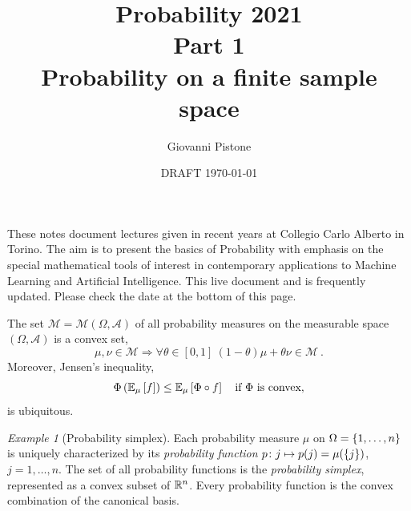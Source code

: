 \documentclass[12pt,a4paper]{amsart}
\title{Probability 2021 \\ Part 1 \\
Probability on a finite sample space}
\author[G. Pistone]{Giovanni Pistone}
\date{DRAFT \today}
\theoremstyle{plain}%
\theoremstyle{definition}
\theoremstyle{remark}
\newtheorem{example}{Example}
\begin{document}
\maketitle

\begin{abstract}

\end{abstract}
These notes document lectures given in recent years at Collegio Carlo Alberto in Torino. The aim is to present the basics of Probability with emphasis on the special mathematical tools of interest in contemporary applications to Machine Learning and Artificial Intelligence. This live document and is frequently updated. Please check the date at the bottom of this page.

\tableofcontents

The set $\mathcal M=\mathcal M(\Omega,\mathcal A)$ of all probability measures on the measurable space $(\Omega,\mathcal A)$ is a convex set,
\begin{equation*}
    \mu,\nu \in \mathcal M \Rightarrow \forall \theta \in [0,1] \ (1-\theta) \mu + \theta \nu  \in \mathcal M \ .
\end{equation*}
Moreover, Jensen's inequality, 
\begin{equation*}
  \Phi\left(\operatorname{\mathbb E}_{\mu}\left[f\right]\right) \leq \operatorname{\mathbb E}_{\mu}\left[\Phi \circ f\right] \quad \text{if $\Phi$ is convex},  
\end{equation*}
is ubiquitous.

\begin{example}[Probability simplex] Each probability measure $\mu$ on
  $\Omega = \left\{1,\dots,n\right\}$ is uniquely characterized by its
  \emph{probability function} $p \colon j \mapsto p(j) =
  \mu(\left\{j\right\})$, $j=1,\dots,n$. The set of all probability functions
  is the \emph{probability simplex}, represented as a convex subset of
  $\mathbb{R}^n$. Every probability function is the
  convex combination of the canonical basis.
\end{example}  
\end{document}
